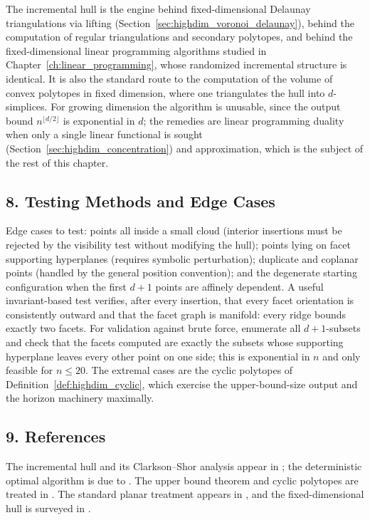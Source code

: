 The incremental hull is the engine behind fixed-dimensional Delaunay
triangulations via lifting (Section~\ref{sec:highdim_voronoi_delaunay}),
behind the computation of regular triangulations and secondary polytopes, and
behind the fixed-dimensional linear programming algorithms studied in
Chapter~\ref{ch:linear_programming}, whose randomized incremental structure is
identical. It is also the standard route to the computation of the volume of
convex polytopes in fixed dimension, where one triangulates the hull into
$d$-simplices. For growing dimension the algorithm is unusable, since the
output bound $n^{\lfloor d/2 \rfloor}$ is exponential in $d$; the remedies are
linear programming duality when only a single linear functional is sought
(Section~\ref{sec:highdim_concentration}) and approximation, which is the
subject of the rest of this chapter.

\subsection{8. Testing Methods and Edge Cases}

Edge cases to test: points all inside a small cloud (interior insertions must
be rejected by the visibility test without modifying the hull); points lying on
facet supporting hyperplanes (requires symbolic perturbation); duplicate and
coplanar points (handled by the general position convention); and the
degenerate starting configuration when the first $d+1$ points are affinely
dependent. A useful invariant-based test verifies, after every insertion, that
every facet orientation is consistently outward and that the facet graph is
manifold: every ridge bounds exactly two facets. For validation against
brute force, enumerate all $d+1$-subsets and check that the facets computed are
exactly the subsets whose supporting hyperplane leaves every other point on
one side; this is exponential in $n$ and only feasible for $n \le 20$. The
extremal cases are the cyclic polytopes of
Definition~\ref{def:highdim_cyclic}, which exercise the upper-bound-size
output and the horizon machinery maximally.

\subsection{9. References}

The incremental hull and its Clarkson--Shor analysis appear in
\cite{mulmuley1994}; the deterministic optimal algorithm is due to
\cite{chazelle1993}. The upper bound theorem and cyclic polytopes are treated
in \cite{matousek2002}. The standard planar treatment appears in
\cite{berg2008}, and the fixed-dimensional hull is surveyed in
\cite{deberg2008}.

